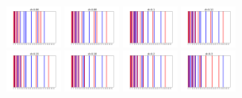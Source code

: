 \documentclass{article}
\numberwithin{equation}{section}
\theoremstyle{definition}
\begin{document}
\begin{figure}[ht]
    \centering
    \begin{subfigure}[t]{\textwidth}
        \centering
        \includegraphics[width=0.2\textwidth]{images/line_line_1_0.06_eigenvector_division.png}
        \includegraphics[width=0.2\textwidth]{images/line_line_1_0.08_eigenvector_division.png}
        \includegraphics[width=0.2\textwidth]{images/line_line_1_0.1_eigenvector_division.png}
        \includegraphics[width=0.2\textwidth]{images/line_line_1_0.12_eigenvector_division.png}
        \includegraphics[width=0.2\textwidth]{images/line_line_1_0.15_eigenvector_division.png}
        \includegraphics[width=0.2\textwidth]{images/line_line_1_0.18_eigenvector_division.png}
        \includegraphics[width=0.2\textwidth]{images/line_line_1_0.2_eigenvector_division.png}
        \includegraphics[width=0.2\textwidth]{images/line_line_1_0.3_eigenvector_division.png}

\end{subfigure}
\end{figure}
\end{document}
